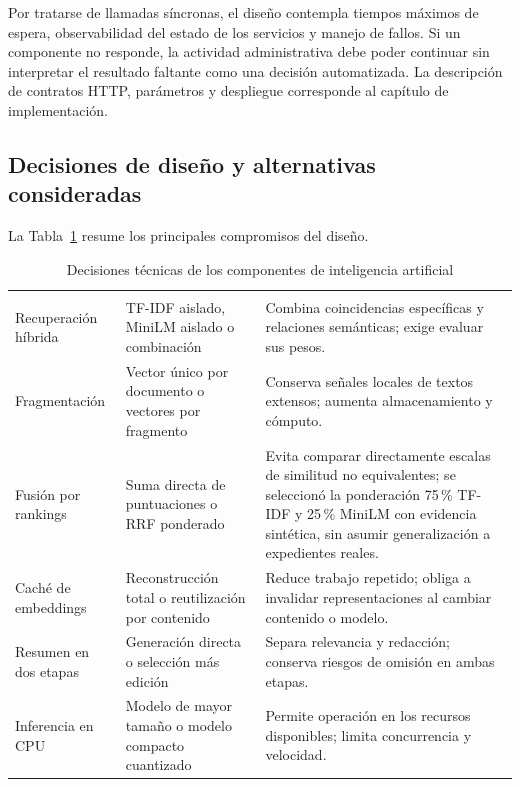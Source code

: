 	Por tratarse de llamadas síncronas, el diseño contempla tiempos máximos de espera,
	observabilidad del estado de los servicios y manejo de fallos. Si un componente no
	responde, la actividad administrativa debe poder continuar sin interpretar el
	resultado faltante como una decisión automatizada. La descripción de contratos
	HTTP, parámetros y despliegue corresponde al capítulo de implementación.

	\subsection{Decisiones de diseño y alternativas consideradas}
	La Tabla~\ref{tab:decisiones_ia} resume los principales compromisos del diseño.
	\small
	\renewcommand{\arraystretch}{1.2}
	\begin{longtable}{|p{3.1cm}|p{4.5cm}|p{6.1cm}|}
		\caption{Decisiones técnicas de los componentes de inteligencia artificial}
		\label{tab:decisiones_ia} \\
		\hline
		\rowcolor{headerblue}
		\headercell{Decisión} & \headercell{Alternativas} & \headercell{Justificación y compromiso} \\ \hline
		\endfirsthead
		\hline
		\rowcolor{headerblue}
		\headercell{Decisión} & \headercell{Alternativas} & \headercell{Justificación y compromiso} \\ \hline
		\endhead
		Recuperación híbrida & TF-IDF aislado, MiniLM aislado o combinación &
		Combina coincidencias específicas y relaciones semánticas; exige evaluar sus pesos. \\ \hline
		Fragmentación & Vector único por documento o vectores por fragmento &
		Conserva señales locales de textos extensos; aumenta almacenamiento y cómputo. \\ \hline
		Fusión por rankings & Suma directa de puntuaciones o RRF ponderado &
		Evita comparar directamente escalas de similitud no equivalentes; se seleccionó
		la ponderación 75\,\% TF-IDF y 25\,\% MiniLM con evidencia sintética,
		sin asumir generalización a expedientes reales. \\ \hline
		Caché de embeddings & Reconstrucción total o reutilización por contenido &
		Reduce trabajo repetido; obliga a invalidar representaciones al cambiar contenido o modelo. \\ \hline
		Resumen en dos etapas & Generación directa o selección más edición &
		Separa relevancia y redacción; conserva riesgos de omisión en ambas etapas. \\ \hline
		Inferencia en CPU & Modelo de mayor tamaño o modelo compacto cuantizado &
		Permite operación en los recursos disponibles; limita concurrencia y velocidad. \\ \hline
	\end{longtable}
	\normalsize
	\renewcommand{\arraystretch}{1}

